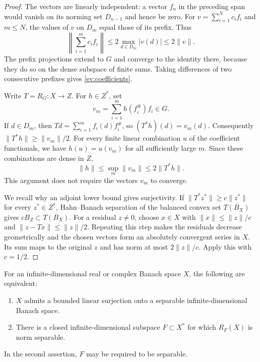 \begin{proof}
The vectors are linearly independent: a vector $f_n$ in the preceding
span would vanish on its norming set $D_{n-1}$ and hence be zero.
For $v=\sum_{i=1}^N c_i f_i$ and $m\le N$, the values of $v$ on $D_m$
equal those of its prefix.  Thus
\[
 \left\|\sum_{i=1}^m c_i f_i\right\|
 \le2\max_{d\in D_m}|v(d)|\le2\|v\|.
\]
The prefix projections extend to $G$ and converge to the identity there,
because they do so on the dense subspace of finite sums.  Taking differences
of two consecutive prefixes gives \eqref{ev:coefficients}.

Write $T=R_G:X\to Z$.  For $h\in Z^*$, set
\[
 v_m=\sum_{i=1}^m h(f_i^\#)f_i\in G.
\]
If $d\in D_m$, then
$Td=\sum_{i=1}^m f_i(d)f_i^\#$, so
$(T^*h)(d)=v_m(d)$.  Consequently
$\|T^*h\|\ge\|v_m\|/2$.
For every finite linear combination $u$ of the coefficient functionals,
we have $h(u)=u(v_m)$ for all sufficiently large $m$.  Since these
combinations are dense in $Z$,
\[
 \|h\|\le\sup_m\|v_m\|\le2\|T^*h\|.
\]
This argument does not require the vectors $v_m$ to converge.

We recall why an adjoint lower bound gives surjectivity.  If
$\|T^*z^*\|\ge c\|z^*\|$ for every $z^*\in Z^*$, Hahn--Banach separation
of the balanced convex set $\overline{T(B_X)}$ gives
$cB_Z\subset\overline{T(B_X)}$.
For a residual $z\ne0$, choose $x\in X$ with
$\|x\|\le\|z\|/c$ and $\|z-Tx\|\le\|z\|/2$.
Repeating this step makes the residuals decrease geometrically and the
chosen vectors form an absolutely convergent series in $X$.
Its sum maps to the original $z$ and has norm at most $2\|z\|/c$.
Apply this with $c=1/2$.
\end{proof}

\begin{proposition}\label{ev:criterion}
For an infinite-dimensional real or complex Banach space $X$, the following
are equivalent:
\begin{enumerate}
\item $X$ admits a bounded linear surjection onto a separable
      infinite-dimensional Banach space.
\item There is a closed infinite-dimensional subspace $F\subset X^*$
      for which $R_F(X)$ is norm separable.
\end{enumerate}
In the second assertion, $F$ may be required to be separable.
\end{proposition}


